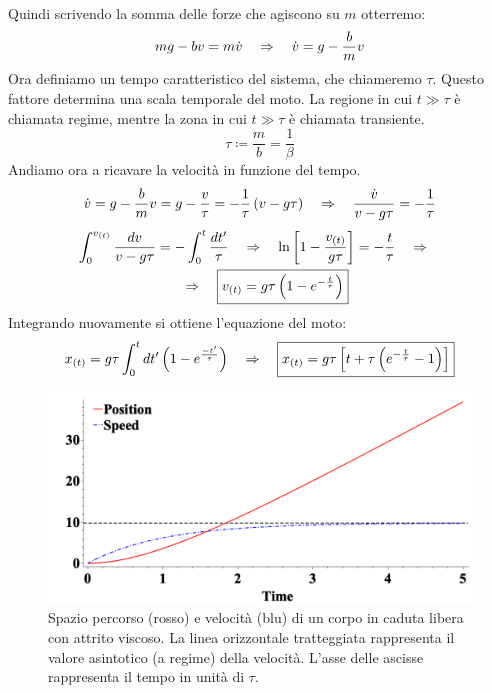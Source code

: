 \\
Quindi scrivendo la somma delle forze che agiscono su $m$ otterremo:
\begin{equation}
    mg - bv = m\dot v \quad\Rightarrow\quad \dot v = g - \frac{b}{m}v
\end{equation}
Ora definiamo un tempo caratteristico del sistema, che chiameremo $\tau$.
Questo fattore determina una scala temporale del moto. La regione in cui
$t\gg\tau$ è chiamata regime, mentre la zona in cui $t\gg\tau$ è chiamata
transiente.
\begin{equation}
    \boxed{\tau \coloneqq \frac{m}{b} = \frac1\beta}
\label{eq:forces:time_constant}
\end{equation}
Andiamo ora a ricavare la velocità in funzione del tempo.
\begin{equation}
    \dot v = g - \frac bmv = g - \frac v\tau = -\frac1\tau\left( v - g\tau\right)
    \quad\Rightarrow\quad \frac{\dot v}{v -g\tau} = -\frac1\tau
\end{equation}
\begin{multline}
   \int_0^{v_{(t)}}\frac{d v}{v -g\tau} = -\int_0^t\frac{dt'}\tau\quad\Rightarrow\quad
   \ln\left[ 1 - \frac{v_{(t)}}{g\tau}\right] = -\frac t\tau\quad\Rightarrow\quad
   \\\quad\Rightarrow\quad\boxed{v_{(t)} = g\tau\left(1-e^{-\frac t\tau}\right)}
\label{eq:forces:viscous_v}
\end{multline}
Integrando nuovamente si ottiene l'equazione del moto:
\begin{equation}
    x_{(t)} = g\tau\int_0^tdt'\left(1-e^{\frac{-t'}\tau}\right) \quad\Rightarrow\quad
    \boxed{x_{(t)} = g\tau\left[ t + \tau\left( e^{-\frac t\tau} - 1\right)\right]}
\label{eq:forces:viscous_x}
\end{equation}
\begin{figure}[htbp]
\center
        \includegraphics[width=13cm]{images/freefallXV.png}
        \caption{Spazio percorso (rosso) e velocità (blu) di un corpo in
        caduta libera con attrito viscoso. La linea orizzontale tratteggiata
        rappresenta il valore asintotico (a regime) della velocità.
        L'asse delle ascisse rappresenta il tempo in unità di $\tau$.}
\label{fig:forces:freefall:curves}
\end{figure}
